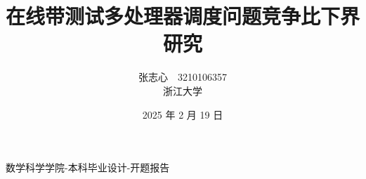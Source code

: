 \documentclass[8pt,mathserif]{beamer}
\author{张志心~~3210106357 \\ 浙江大学}
\title{在线带测试多处理器调度问题竞争比下界研究}
\date{2025 年 2 月 19 日}
\begin{document}
\fangsong
\begin{frame}{数学科学学院-本科毕业设计-开题报告}
    \titlepage
    \begin{figure}[htpb]
        \begin{center}
            \vspace*{-0.5cm}
        \end{center}
    \end{figure}
\end{frame}

\end{document}
